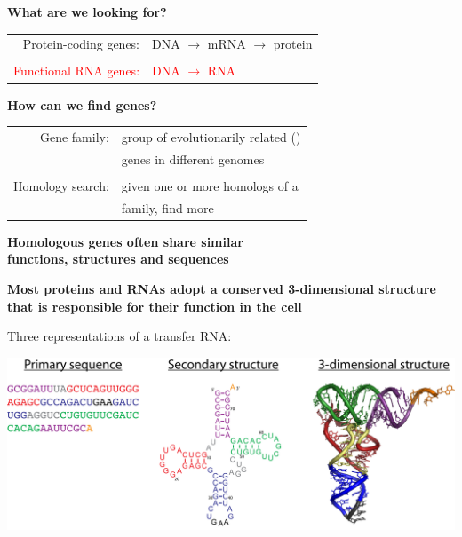 \documentclass[landscape]{slides}
\begin{document}
\begin{slide}
\begin{center}
\textbf{What are we looking for?}
\end{center}
\medskip

\begin{center}
\begin{tabular}{rl}
Protein-coding genes: & DNA $\rightarrow$ mRNA $\rightarrow$ protein \\
& \\
\textcolor{red}{Functional RNA genes:} & \textcolor{red}{DNA $\rightarrow$ RNA}
\end{tabular}
\medskip

\medskip

\medskip

\medskip

\medskip

\textbf{How can we find genes?}

\begin{tabular}{rl}
Gene family: & group of evolutionarily related ({\color{red}{\em homologous}}) \\
& genes in different genomes \\
& \\
Homology search: & given one or more homologs of a \\
& family, find more \\
\end{tabular}


{\bf Homologous genes often share similar \\ functions, structures and
  sequences}

\end{center}

\vfill
\end{slide}
\begin{slide}
\begin{center}
{\bf Most proteins and RNAs adopt a conserved 3-dimensional 
  structure that is responsible for their function in the cell}

\medskip

Three representations of a transfer RNA:

\includegraphics[width=9in]{figs/trna-123}

\end{center}

\vfill

\end{slide}
\end{document}
